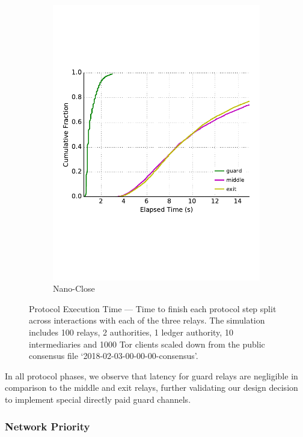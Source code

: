 \begin{figure}
\begin{subfigure}[t]{0.32\textwidth}
\includegraphics[trim={0 3cm 0 3cm}, clip, width=1.0\textwidth]{images/payment_close.pdf}
		\caption{Nano-Close}
\label{fig:payments_close}
	\end{subfigure}
	\caption{Protocol Execution Time --- Time to finish each protocol step
          split across interactions with each of the three relays. The
          simulation includes 100 relays, 2 authorities, 1 ledger authority, 10
          intermediaries and 1000 Tor clients scaled down from the public
          consensus file `2018-02-03-00-00-00-consensus'.}
\label{fig:latencymeasurements}
\end{figure}

In all protocol phases, we observe that latency for guard relays are negligible
in comparison to the middle and exit relays, further validating our design
decision to implement special directly paid guard channels.

\subsubsection{Network Priority}
\label{sec:priority_exp}

